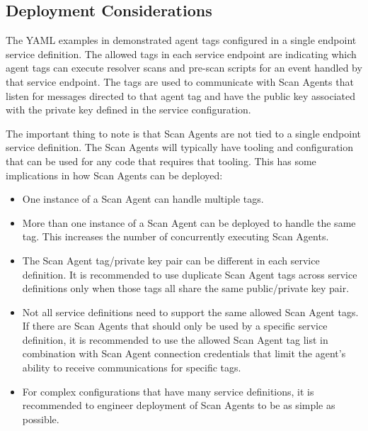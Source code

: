 \subsection{Deployment Considerations}

The YAML examples in  demonstrated agent tags
configured in a single endpoint service definition.  The allowed tags in each service endpoint are
indicating which agent tags can execute resolver scans and pre-scan scripts for an event handled by that service endpoint.
The tags are used to communicate with Scan Agents that listen for messages directed to that agent tag and
have the public key associated with the private key defined in the service configuration.

The important thing to note is that Scan Agents are not tied to a single
\cxoneflow endpoint service definition.  The Scan Agents will typically have
tooling and configuration that can be used for any code that requires that tooling.  This
has some implications in how Scan Agents can be deployed:

\begin{itemize}
  \item One instance of a Scan Agent can handle multiple tags.
  
  \item More than one instance of a Scan Agent can be deployed to handle the same tag.  This increases the number of concurrently
  executing Scan Agents.

  \item The Scan Agent tag/private key pair can be different in each service definition.  It is recommended to
  use duplicate Scan Agent tags across \cxoneflow service definitions only when those tags all share the same public/private
  key pair.

  \item Not all service definitions need to support the same allowed Scan Agent tags.  If there are Scan Agents
  that should only be used by a specific service definition, it is recommended to use the allowed Scan Agent tag list
  in combination with Scan Agent connection credentials that limit the agent's ability to receive
  communications for specific tags.

  \item For complex \cxoneflow configurations that have many service definitions, it is recommended to engineer
  deployment of Scan Agents to be as simple as possible.
    
\end{itemize}


